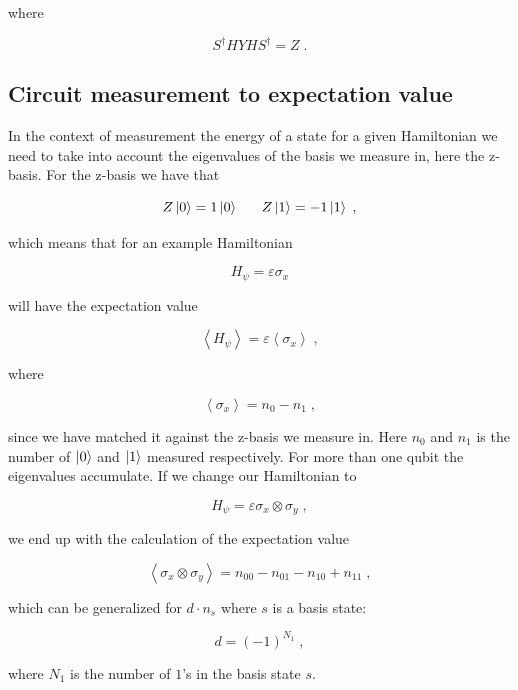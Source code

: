 where

\begin{equation}
    S^{\dagger}HYHS^{\dagger} = Z \; .
\end{equation}

\subsection{Circuit measurement to expectation value}

In the context of measurement the energy of a state for a given Hamiltonian we need to take into account the eigenvalues of the basis we measure in, here the z-basis. For the z-basis we have that

\begin{equation}
    Z\ket{0} = 1\ket{0} \;\;\;\;\;\;Z\ket{1} = -1\ket{1} \;,
\end{equation}

which means that for an example Hamiltonian

\begin{equation}
H_{\psi} = \varepsilon\sigma_x
\end{equation}

will have the expectation value

\begin{equation}
\left < H_{\psi} \right > = \varepsilon \left < \sigma_x \right > \; ,
\end{equation}

where

\begin{equation}
\left < \sigma_x \right > = n_0 - n_1 \; ,
\end{equation}

since we have matched it against the z-basis we measure in. Here $n_0$ and $n_1$ is the number of $\ket{0}$ and $\ket{1}$ measured respectively. For more than one qubit the eigenvalues accumulate. If we change our Hamiltonian to

\begin{equation}
H_{\psi} = \varepsilon\sigma_x \otimes \sigma_y \; ,
\end{equation}

we end up with the calculation of the expectation value

\begin{equation}
\left < \sigma_{x} \otimes \sigma_y \right > = n_{00} - n_{01} - n_{10} + n_{11}\; ,
\end{equation}

which can be generalized for $d\cdot n_s$ where $s$ is a basis state:

\begin{equation}
    d = (-1)^{N_1} \; ,
\end{equation}

where $N_1$ is the number of $1$'s in the basis state $s$.
